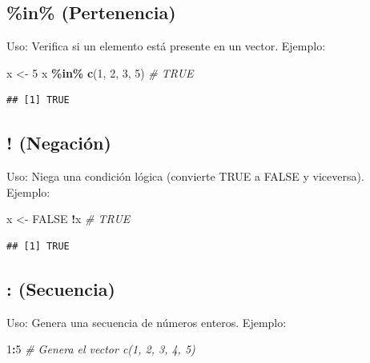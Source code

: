 \documentclass[
]{book}
\newenvironment{Shaded}{\begin{snugshade}}{\end{snugshade}}
\newcommand{\CommentTok}[1]{\textcolor[rgb]{0.56,0.35,0.01}{\textit{#1}}}
\newcommand{\ConstantTok}[1]{\textcolor[rgb]{0.56,0.35,0.01}{#1}}
\newcommand{\DecValTok}[1]{\textcolor[rgb]{0.00,0.00,0.81}{#1}}
\newcommand{\FunctionTok}[1]{\textcolor[rgb]{0.13,0.29,0.53}{\textbf{#1}}}
\newcommand{\NormalTok}[1]{#1}
\newcommand{\OtherTok}[1]{\textcolor[rgb]{0.56,0.35,0.01}{#1}}
\newcommand{\SpecialCharTok}[1]{\textcolor[rgb]{0.81,0.36,0.00}{\textbf{#1}}}
\begin{document}
\hypertarget{pertenencia}{%
\subsection{\%in\% (Pertenencia)}\label{pertenencia}}

Uso: Verifica si un elemento está presente en un vector.
Ejemplo:

\begin{Shaded}
\begin{Highlighting}[]
\NormalTok{x }\OtherTok{\textless{}{-}} \DecValTok{5}
\NormalTok{x }\SpecialCharTok{\%in\%} \FunctionTok{c}\NormalTok{(}\DecValTok{1}\NormalTok{, }\DecValTok{2}\NormalTok{, }\DecValTok{3}\NormalTok{, }\DecValTok{5}\NormalTok{)  }\CommentTok{\# TRUE}
\end{Highlighting}
\end{Shaded}

\begin{verbatim}
## [1] TRUE
\end{verbatim}

\hypertarget{negaciuxf3n}{%
\subsection{! (Negación)}\label{negaciuxf3n}}

Uso: Niega una condición lógica (convierte TRUE a FALSE y viceversa).
Ejemplo:

\begin{Shaded}
\begin{Highlighting}[]
\NormalTok{x }\OtherTok{\textless{}{-}} \ConstantTok{FALSE}
\SpecialCharTok{!}\NormalTok{x  }\CommentTok{\# TRUE}
\end{Highlighting}
\end{Shaded}

\begin{verbatim}
## [1] TRUE
\end{verbatim}

\hypertarget{secuencia}{%
\subsection{: (Secuencia)}\label{secuencia}}

Uso: Genera una secuencia de números enteros.
Ejemplo:

\begin{Shaded}
\begin{Highlighting}[]
\DecValTok{1}\SpecialCharTok{:}\DecValTok{5}  \CommentTok{\# Genera el vector c(1, 2, 3, 4, 5)}
\end{Highlighting}
\end{Shaded}
\end{document}
